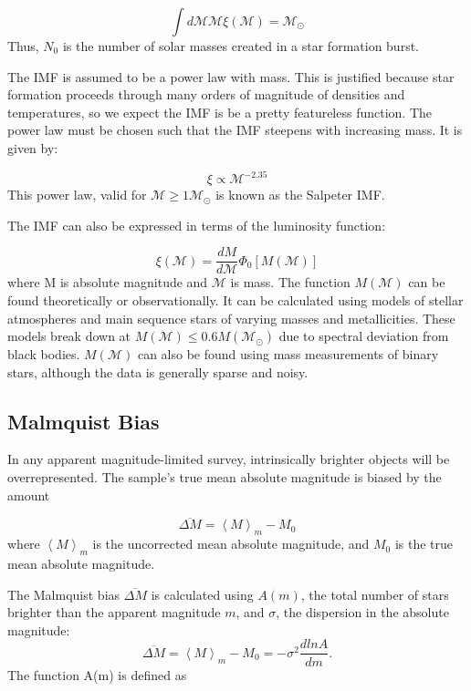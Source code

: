 \begin{equation}
\int d\mathcal{M} \mathcal{M} \xi(\mathcal{M}) = \mathcal{M}_\odot
\end{equation}
Thus, $N_0$ is the number of solar masses created in a star formation burst. 

The IMF is assumed to be a power law with mass. This is justified because star formation proceeds through many orders of magnitude of densities and temperatures, so we expect the IMF is be a pretty featureless function. The power law must be chosen such that the IMF steepens with increasing mass. It is given by:

\begin{equation}
\xi  \propto \mathcal{M}^{-2.35}
\end{equation}
This power law, valid for $\mathcal{M} \geq 1\mathcal{M}_\odot$ is known as the Salpeter IMF.

The IMF can also be expressed in terms of the luminosity function:

\begin{equation}
\xi(\mathcal{M}) = \frac{dM}{d\mathcal{M}} \Phi_0 [M(\mathcal{M})]
\end{equation}
where M is absolute magnitude and $\mathcal{M}$ is mass. The function $M(\mathcal{M})$ can be found theoretically or observationally. It can be calculated using models of stellar atmospheres and main sequence stars of varying masses and metallicities. These models break down at $M(\mathcal{M}) \leq 0.6 M(\mathcal{M}_\odot)$ due to spectral deviation from black bodies. $M(\mathcal{M})$ can also be found using mass measurements of binary stars, although the data is generally sparse and noisy. 

\subsection{Malmquist Bias}

In any apparent magnitude-limited survey, intrinsically brighter objects will be overrepresented. The sample's true mean absolute magnitude is biased by the amount

\begin{equation}
\overline{\Delta M} = \left<M\right>_m - M_0
\end{equation}
where $\left<M\right>_m $ is the uncorrected mean absolute magnitude, and $M_0$ is the true mean absolute magnitude. 

The Malmquist bias $\overline{\Delta M}$ is calculated using $A(m)$, the total number of stars brighter than the apparent magnitude $m$, and $\sigma$, the dispersion in the absolute magnitude:
\begin{equation}
\overline{\Delta M} = \left<M\right>_m - M_0 = -\sigma^2 \frac{d ln A}{dm}.
\end{equation}
The function A(m) is defined as

